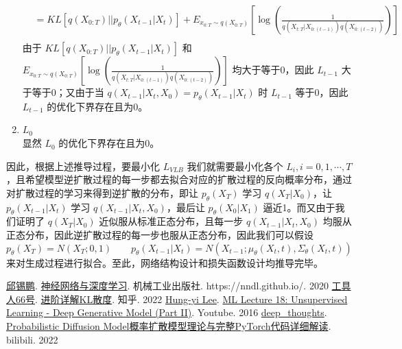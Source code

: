 \documentclass[12pt,a4paper,UTF8]{article}
\begin{document}
\begin{enumerate}
\[\begin{aligned}
&=KL\left[q\left(X_{0:T}\right)||p_{\theta}\left(X_{t-1}|X_t\right)\right]+E_{x_{0:T}\sim q\left(X_{0:T}\right)}\left[\log\left(\frac{1}{q\left(X_{t:T}|X_{0:\left(t-1\right)}\right)q\left(X_{0:\left(t-2\right)}\right)}\right)\right]\\
\end{aligned}\]
由于 $KL\left[q\left(X_{0:T}\right)||p_{\theta}\left(X_{t-1}|X_t\right)\right]$ 和 $E_{x_{0:T}\sim q\left(X_{0:T}\right)}\left[\log\left(\frac{1}{q\left(X_{t:T}|X_{0:\left(t-1\right)}\right)q\left(X_{0:\left(t-2\right)}\right)}\right)\right]$ 均大于等于0，因此 $L_{t-1}$ 大于等于0；又由于当 $q\left(X_{t-1}|X_t,X_0\right)=p_{\theta}\left(X_{t-1}|X_t\right)$ 时 $L_{t-1}$ 等于0，因此 $L_{t-1}$ 的优化下界存在且为0。
\item $L_0$\\
显然 $L_0$ 的优化下界存在且为0。
\end{enumerate}

\indent 因此，根据上述推导过程，要最小化 $L_{VLB}$ 我们就需要最小化各个 $L_i,i=0,1,\cdots,T$，且希望模型逆扩散过程的每一步都去拟合对应的扩散过程的反向概率分布，通过对扩散过程的学习来得到逆扩散的分布，即让 $p_{\theta}\left(X_T\right)$ 学习 $q\left(X_T|X_0\right)$，让 $p_{\theta}\left(X_{t-1}|X_t\right)$ 学习 $q\left(X_{t-1}|X_t,X_0\right)$，最后让 $p_{\theta}\left(X_0|X_1\right)$ 逼近1。而又由于我们证明了 $q\left(X_T|X_0\right)$ 近似服从标准正态分布，且每一步 $q\left(X_{t-1}|X_t,X_0\right)$ 均服从正态分布，因此逆扩散过程的每一步也服从正态分布，因此我们可以假设
\[p_{\theta}\left(X_T\right)=N\left(X_T;0,1\right)\qquad p_{\theta}\left(X_{t-1}|X_t\right)=N\left(X_{t-1};\mu_{\theta}\left(X_t,t\right),\Sigma_{\theta}\left(X_t,t\right)\right)\]
来对生成过程进行拟合。至此，网络结构设计和损失函数设计均推导完毕。




\newpage
\begin{thebibliography}{99}
\href{https://xpqiu.github.io/}{邱锡鹏}. \href{https://nndl.github.io/}{神经网络与深度学习}. 机械工业出版社. https://nndl.github.io/. 2020
\href{https://www.zhihu.com/people/adv-adj}{工具人66号}. \href{https://zhuanlan.zhihu.com/p/372835186}{进阶详解KL散度}. 知乎. 2022
\href{https://www.youtube.com/c/HungyiLeeNTU}{Hung-yi Lee}. \href{https://www.youtube.com/watch?v=8zomhgKrsmQ&list=PLJV_el3uVTsPy9oCRY30oBPNLCo89yu49&index=27}{ML Lecture 18: Unsupervised Learning - Deep Generative Model (Part II)}. Youtube. 2016
\href{https://space.bilibili.com/373596439}{deep\_thoughts}. \href{https://www.bilibili.com/video/BV1b541197HX?vd_source=e1a23aab8211cd62864bd7e4ee217986}{Probabilistic Diffusion Model概率扩散模型理论与完整PyTorch代码详细解读}. bilibili. 2022
\end{thebibliography}
\end{document}

